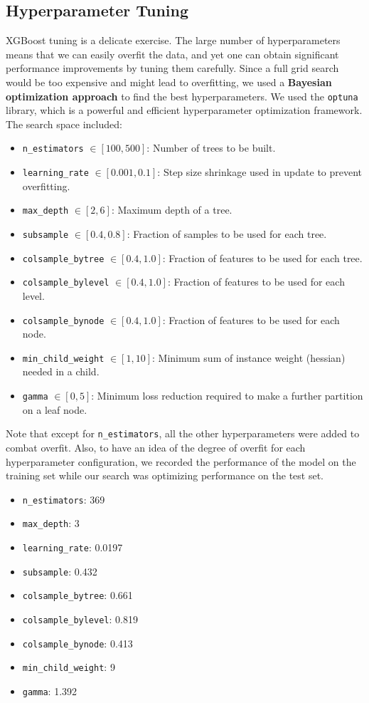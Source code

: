\documentclass{article}
\begin{document}
\subsection{Hyperparameter Tuning}
XGBoost tuning is a delicate exercise. The large number of hyperparameters means that we can easily overfit the data, and yet one can obtain significant performance improvements by tuning them carefully. Since a full grid search would be too expensive and might lead to overfitting, we used a \textbf{Bayesian optimization approach} to find the best hyperparameters. We used the \texttt{optuna} library, which is a powerful and efficient hyperparameter optimization framework. The search space included:
\begin{itemize}
    \item \texttt{n\_estimators} $\in [100, 500]$: Number of trees to be built.
    \item \texttt{learning\_rate} $\in [0.001, 0.1]$: Step size shrinkage used in update to prevent overfitting.
    \item \texttt{max\_depth} $\in [2, 6]$: Maximum depth of a tree.
    \item \texttt{subsample} $\in [0.4, 0.8]$: Fraction of samples to be used for each tree.
    \item \texttt{colsample\_bytree} $\in [0.4, 1.0]$: Fraction of features to be used for each tree.
    \item \texttt{colsample\_bylevel} $\in [0.4, 1.0]$: Fraction of features to be used for each level.
    \item \texttt{colsample\_bynode} $\in [0.4, 1.0]$: Fraction of features to be used for each node.
    \item \texttt{min\_child\_weight} $\in [1, 10]$: Minimum sum of instance weight (hessian) needed in a child.
    \item \texttt{gamma} $\in [0, 5]$: Minimum loss reduction required to make a further partition on a leaf node.
\end{itemize}
Note that except for \texttt{n\_estimators}, all the other hyperparameters were added to combat overfit. Also, to have an idea of the degree of overfit for each hyperparameter configuration, we recorded the performance of the model on the training set while our search was optimizing performance on the test set.

\begin{itemize}
    \item \texttt{n\_estimators}: 369
    \item \texttt{max\_depth}: 3
    \item \texttt{learning\_rate}: 0.0197
    \item \texttt{subsample}: 0.432
    \item \texttt{colsample\_bytree}: 0.661
    \item \texttt{colsample\_bylevel}: 0.819
    \item \texttt{colsample\_bynode}: 0.413
    \item \texttt{min\_child\_weight}: 9
    \item \texttt{gamma}: 1.392
\end{itemize}
\end{document}
